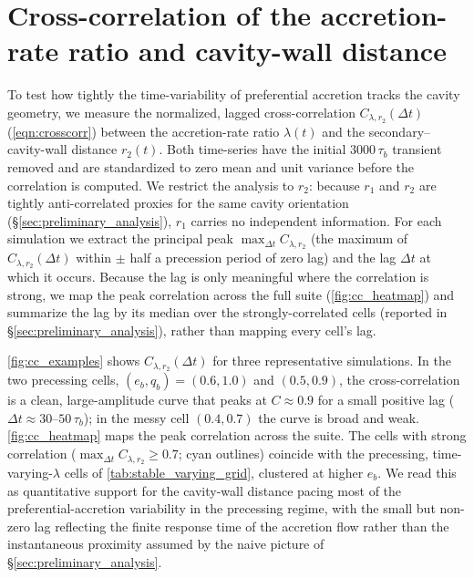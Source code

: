 \documentclass[fleqn,usenatbib]{mnras}
\begin{document}



\appendix

\section{Cross-correlation of the accretion-rate ratio and cavity-wall distance}\label{sec:appendix_crosscorr}

To test how tightly the time-variability of preferential accretion tracks the cavity geometry, we measure the normalized, lagged cross-correlation $C_{\lambda, r_2}(\Delta t)$ (\autoref{eqn:crosscorr}) between the accretion-rate ratio $\lambda(t)$ and the secondary--cavity-wall distance $r_2(t)$. Both time-series have the initial $3000\,\tau_b$ transient removed and are standardized to zero mean and unit variance before the correlation is computed. We restrict the analysis to $r_2$: because $r_1$ and $r_2$ are tightly anti-correlated proxies for the same cavity orientation (\S\ref{sec:preliminary_analysis}), $r_1$ carries no independent information. For each simulation we extract the principal peak $\max_{\Delta t} C_{\lambda, r_2}$ (the maximum of $C_{\lambda, r_2}(\Delta t)$ within $\pm$ half a precession period of zero lag) and the lag $\Delta t$ at which it occurs. Because the lag is only meaningful where the correlation is strong, we map the peak correlation across the full suite (\autoref{fig:cc_heatmap}) and summarize the lag by its median over the strongly-correlated cells (reported in \S\ref{sec:preliminary_analysis}), rather than mapping every cell's lag.

\autoref{fig:cc_examples} shows $C_{\lambda, r_2}(\Delta t)$ for three representative simulations. In the two precessing cells, $(e_b, q_b) = (0.6, 1.0)$ and $(0.5, 0.9)$, the cross-correlation is a clean, large-amplitude curve that peaks at $C \approx 0.9$ for a small positive lag ($\Delta t \approx 30$--$50\,\tau_b$); in the messy cell $(0.4, 0.7)$ the curve is broad and weak. \autoref{fig:cc_heatmap} maps the peak correlation across the suite. The cells with strong correlation ($\max_{\Delta t} C_{\lambda, r_2} \ge 0.7$; cyan outlines) coincide with the precessing, time-varying-$\lambda$ cells of \autoref{tab:stable_varying_grid}, clustered at higher $e_b$. We read this as quantitative support for the cavity-wall distance pacing most of the preferential-accretion variability in the precessing regime, with the small but non-zero lag reflecting the finite response time of the accretion flow rather than the instantaneous proximity assumed by the naive picture of \S\ref{sec:preliminary_analysis}.
\end{document}

